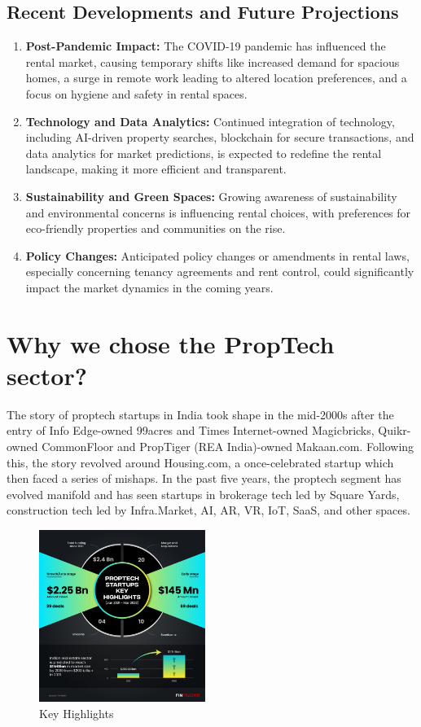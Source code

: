 \subsection{Recent Developments and Future Projections}
\begin{enumerate}
      \item \textbf{Post-Pandemic Impact:} The COVID-19 pandemic has influenced the rental market, causing temporary shifts
            like increased demand for spacious homes, a surge in remote work leading to altered location preferences, and a
            focus on hygiene and safety in rental spaces.
      \item \textbf{Technology and Data Analytics:} Continued integration of technology, including AI-driven property searches,
            blockchain for secure transactions, and data analytics for market predictions, is expected to redefine the rental
            landscape, making it more efficient and transparent.
      \item \textbf{Sustainability and Green Spaces:} Growing awareness of sustainability and environmental concerns is
            influencing rental choices, with preferences for eco-friendly properties and communities on the rise.
      \item \textbf{Policy Changes:} Anticipated policy changes or amendments in rental laws, especially concerning tenancy
            agreements and rent control, could significantly impact the market dynamics in the coming years.
\end{enumerate}

\section{Why we chose the PropTech sector?}
The story of proptech startups in India took shape in the mid-2000s after the entry of Info Edge-owned
99acres and Times Internet-owned Magicbricks, Quikr-owned CommonFloor and PropTiger (REA India)-owned Makaan.com.
Following this, the story revolved around Housing.com, a once-celebrated startup which then faced a series of mishaps.
In the past five years, the proptech segment has evolved manifold and has seen startups in brokerage tech led by
Square Yards, construction tech led by Infra.Market, AI, AR, VR, IoT, SaaS, and other spaces.

\clearpage
\begin{figure}
      \centering
      \includegraphics[width=0.48\textwidth]{Images/proptech1.jpg}
      \caption{Key Highlights}
\end{figure}

